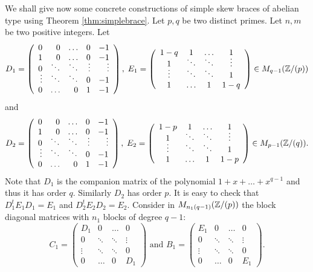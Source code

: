We shall give now some concrete constructions of simple skew braces of abelian type using Theorem \ref{thm:simplebrace}. Let $p,q$ be two distinct primes. Let $n,m$ be two positive integers. Let
$$D_1=\left(\begin{array}{rrrrr}
0&0&\ldots &0&-1\\
\vspace{-5pt}1&0&\ldots &0&-1\\
\vspace{-5pt}0&\ddots &\ddots &\vdots&\vdots\\
\vdots &\ddots &\ddots &0&-1\\
0&\ldots&0&1&-1\end{array}\right),\; E_1=\left(\begin{array}{cccc}
\vspace{-5pt}1-q&1&\ldots &1\\
\vspace{-5pt}1&\ddots &\ddots&\vdots\\
\vdots &\ddots &\ddots &1\\
1&\ldots&1&1-q\end{array}\right)\in M_{q-1}(\Z/(p))$$
 and  
 $$D_2=\left(\begin{array}{rrrrr}
0&0&\ldots&0&-1\\
\vspace{-5pt}1&0&\ldots&0&-1\\
\vspace{-5pt}0&\ddots&\ddots&\vdots&\vdots\\
\vdots&\ddots&\ddots&0&-1\\
0&\ldots&0&1&-1\end{array}\right),\; E_2=\left(\begin{array}{cccc}
\vspace{-5pt}1-p&1&\ldots &1\\
\vspace{-5pt}1&\ddots &\ddots&\vdots\\
\vdots &\ddots &\ddots &1\\
1&\ldots&1&1-p\end{array}\right)\in M_{p-1}(\Z/(q)).$$ 
Note that $D_1$ is the companion matrix of the polynomial $1+x+\dots +x^{q-1}$ and thus it has order $q$. Similarly $D_2$ has order $p$. 
It is easy to check that $D_1^tE_1D_1=E_1$ and $D_2^tE_2D_2=E_2$. Consider in $M_{n_1(q-1)}(\mathbb{Z}/(p))$ the block diagonal matrices with $n_1$ blocks of degree $q-1$:
$$C_1=\left(\begin{array}{cccc}
	D_1&0&\ldots &0\\
	0&\ddots &\ddots&\vdots\\
	\vdots &\ddots &\ddots &0\\
	0&\ldots&0&D_1\end{array}\right)\mbox{ and } B_1=\left(\begin{array}{cccc}
	E_1&0&\ldots &0\\
	0&\ddots &\ddots&\vdots\\
	\vdots &\ddots &\ddots &0\\
	0&\ldots&0&E_1\end{array}\right).$$
